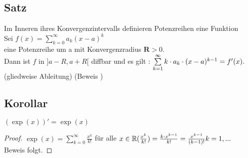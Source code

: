 \subsection[Satz: Potenzreihen und diverenzierbarkeit]{Satz}
Im Inneren ihres Konvergenzintervalls definieren Potenzreihen eine Funktion\\
Sei $f(x) = \sum\limits_{k = 0}^{\infty} a_k (x-a)^k$\\
eine Potenzreihe um a mit Konvergenzradius $\mathbf{R} > 0.$\\
Dann ist $f$ in $]a-R, a+R[$ diffbar und es gilt : $\sum\limits_{k =1}^{\infty} k \cdot a_k \cdot (x-a)^{k-1} = f'(x).$\\
\hfil (gliedweise Ableitung)\newline
\hfil (Beweis \cite{k7})
\subsection{Korollar}
$(\exp(x))' = \exp(x)$
\begin{proof}
$\exp(x) = \sum\limits_{k = 0}^{\infty} \frac{x^k}{k!}$ für alle $x \in \mathbb{R} \\
(\frac{x^k}{k!}) = \frac{k \cdot x^{k-1}}{k!} = \frac{x^{k-1}}{(k-1)!}\\
k = 1, ...$\\
Beweis folgt.
\end{proof}
